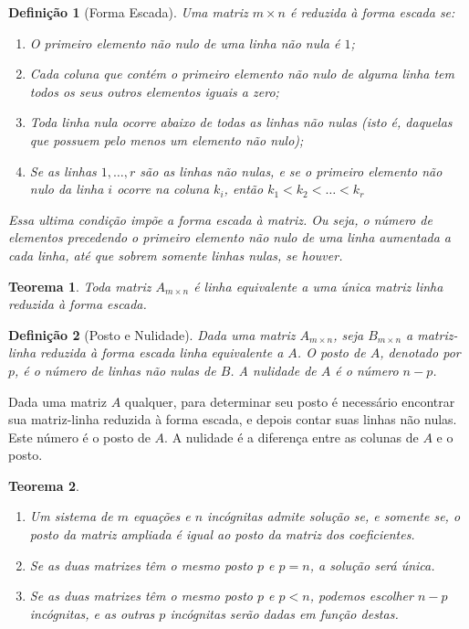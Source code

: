 \documentclass[oneside,a4paper,12pt]{article}
\newtheorem{theorem}{Teorema}[section]
\newtheorem{definition}{Definição}[section]
\begin{document}
\begin{definition}[Forma Escada]
	Uma matriz $m \times n$ é reduzida à forma escada se:
	\begin{enumerate}
		\item O primeiro elemento não nulo de uma linha não nula é $1$;
		\item Cada coluna que contém o primeiro elemento não nulo de alguma linha tem todos os seus outros elementos iguais a zero;
		\item Toda linha nula ocorre abaixo de todas as linhas não nulas (isto é, daquelas que possuem pelo menos um elemento não nulo);
		\item Se as linhas $1, \dots, r$ são as linhas não nulas, e se o primeiro elemento não nulo da linha $i$ ocorre na coluna $k_i$, então $k_1<k_2<\dots<k_r$
	\end{enumerate}
	Essa ultima condição impõe a forma escada à matriz. Ou seja, o número de elementos precedendo o primeiro elemento não nulo de uma linha aumentada a cada linha, até que sobrem somente linhas nulas, se houver.
\end{definition}

\begin{theorem}
	Toda matriz $A_{m \times n}$ é linha equivalente a uma única matriz linha reduzida à forma escada.
\end{theorem}

\begin{definition}[Posto e Nulidade]
	Dada uma matriz $A_{m \times n}$, seja $B_{m \times n}$ a matriz-linha reduzida à forma escada linha equivalente a $A$. O posto de $A$, denotado por $p$, é o número de linhas não nulas de $B$. A nulidade de $A$ é o número $n-p$.
\end{definition}

Dada uma matriz $A$ qualquer, para determinar seu posto é necessário encontrar sua matriz-linha reduzida à forma escada, e depois contar suas linhas não nulas. Este número é o posto de $A$. A nulidade é a diferença entre as colunas de $A$ e o posto.


\begin{theorem}
	\begin{enumerate}
		\item Um sistema de $m$ equações e $n$ incógnitas admite solução se, e somente se, o posto da matriz ampliada é igual ao posto da matriz dos coeficientes.
		\item Se as duas matrizes têm o mesmo posto $p$ e $p=n$, a solução será única.
		\item Se as duas matrizes têm o mesmo posto $p$ e $p<n$, podemos escolher $n-p$ incógnitas, e as outras $p$ incógnitas serão dadas em função destas.
	\end{enumerate}
\end{theorem}
\end{document}

